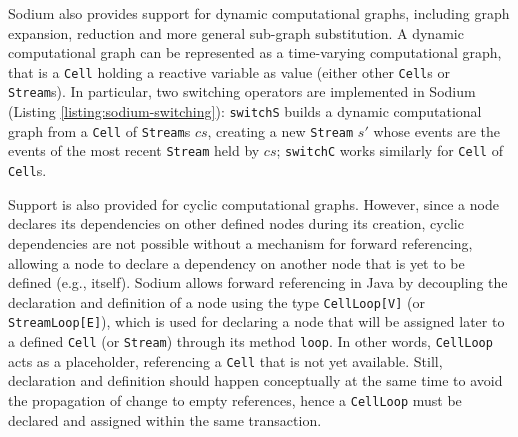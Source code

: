 

Sodium also provides support for dynamic computational graphs, including graph
expansion, reduction and more general sub-graph substitution. A dynamic
computational graph can be represented as a time-varying computational graph,
that is a \texttt{Cell} holding a reactive variable as value (either other
\texttt{Cell}s or \texttt{Stream}s). In particular, two switching operators are
implemented in Sodium (Listing \ref{listing:sodium-switching}):
\texttt{switchS} builds a dynamic computational graph from a \texttt{Cell} of
\texttt{Stream}s $cs$, creating a new \texttt{Stream} $s'$ whose events are the
events of the most recent \texttt{Stream} held by $cs$; \texttt{switchC} works
similarly for \texttt{Cell} of \texttt{Cell}s.



Support is also provided for cyclic computational graphs. However, since a node
declares its dependencies on other defined nodes during its creation, cyclic
dependencies are not possible without a mechanism for forward referencing,
allowing a node to declare a dependency on another node that is yet to be
defined (e.g., itself). Sodium allows forward referencing in Java by decoupling
the declaration and definition of a node using the type \texttt{CellLoop[V]}
(or \texttt{StreamLoop[E]}), which is used for declaring a node that will be
assigned later to a defined \texttt{Cell} (or \texttt{Stream}) through its
method \texttt{loop}. In other words, \texttt{CellLoop} acts as a placeholder,
referencing a \texttt{Cell} that is not yet available. Still, declaration and
definition should happen conceptually at the same time to avoid the propagation
of change to empty references, hence a \texttt{CellLoop} must be declared and
assigned within the same transaction.



